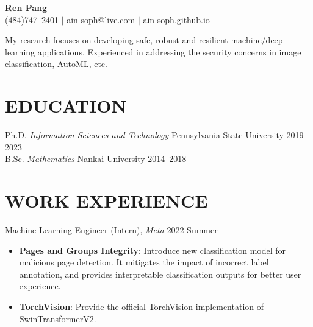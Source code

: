 \documentclass[letterpaper,11pt]{article}
\begin{document}
\begin{center}
    \textbf{\Huge Ren Pang} \\ \vspace{5pt}
    \small \faPhone* (484)747--2401 \hspace{1pt} $|$
    \hspace{1pt} \faEnvelope\hspace{2pt}ain-soph@live.com \hspace{1pt} $|$ 
    \hspace{1pt} \faGithub\hspace{2pt}ain-soph.github.io
    \\ \vspace{0pt}
\end{center}

\noindent
My research focuses on developing safe, robust and resilient machine/deep learning applications. Experienced in addressing the security concerns in image classification, AutoML, etc.

\section{EDUCATION}
Ph.D. \hspace{1em} \textit{Information Sciences and Technology} \hspace{1em} Pennsylvania State University \hfill 2019--2023 \\
B.Sc. \hspace{1em} \textit{Mathematics} \hspace{11.8em} Nankai University \hfill 2014--2018

\section{WORK EXPERIENCE}
Machine Learning Engineer (Intern), \textit{Meta}  \hfill 2022 Summer
\begin{itemize}
\item[]
\vspace{-5pt}\textbf{Pages and Groups Integrity}:
Introduce new classification model for malicious page detection. It mitigates the impact of incorrect label annotation, and provides interpretable classification outputs for better user experience.
\item[]
\vspace{-5pt}\textbf{TorchVision}:
Provide the official TorchVision implementation of SwinTransformerV2.
\end{itemize}
\end{document}
